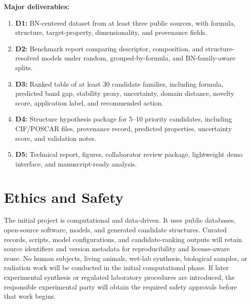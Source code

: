 \documentclass[10pt,a4paper]{article}
\begin{document}
\textbf{Major deliverables:}
\begin{enumerate}
  \item \textbf{D1:} BN-centered dataset from at least three public sources, with formula, structure, target-property, dimensionality, and provenance fields.
  \item \textbf{D2:} Benchmark report comparing descriptor, composition, and structure-resolved models under random, grouped-by-formula, and BN-family-aware splits.
  \item \textbf{D3:} Ranked table of at least 30 candidate families, including formula, predicted band gap, stability proxy, uncertainty, domain distance, novelty score, application label, and recommended action.
  \item \textbf{D4:} Structure hypothesis package for 5--10 priority candidates, including CIF/POSCAR files, provenance record, predicted properties, uncertainty score, and validation notes.
  \item \textbf{D5:} Technical report, figures, collaborator review package, lightweight demo interface, and manuscript-ready analysis.
\end{enumerate}

\section{Ethics and Safety}
The initial project is computational and data-driven. It uses public databases, open-source software, models, and generated candidate structures. Curated records, scripts, model configurations, and candidate-ranking outputs will retain source identifiers and version metadata for reproducibility and license-aware reuse. No human subjects, living animals, wet-lab synthesis, biological samples, or radiation work will be conducted in the initial computational phase. If later experimental synthesis or regulated laboratory procedures are introduced, the responsible experimental party will obtain the required safety approvals before that work begins.
\end{document}
